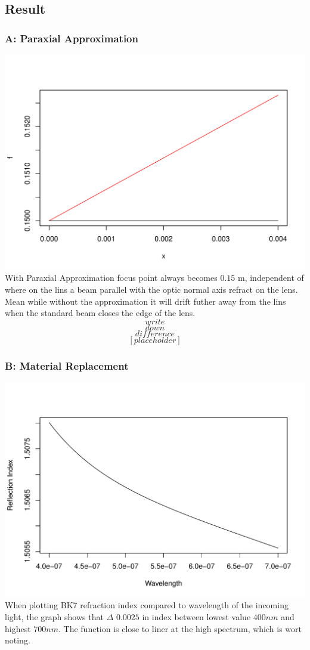 \documentclass[12pt]{article}
\begin{document}
\subsection{Result}

\subsubsection{A: Paraxial Approximation}
\includegraphics[scale=0.6]{para_approx.pdf}
With Paraxial Approximation focus point always becomes $0.15$ m, independent 
of where on the lins a beam parallel with the optic normal axis refract on the lens.
Mean while without the approximation it will drift futher away from the lins 
when the standard beam closes the edge of the lens.
$$write$$ $$down$$ $$difference$$ $$[placeholder]$$

\subsubsection{B: Material Replacement}
\includegraphics[scale=0.6]{BK7_index.pdf}
When plotting BK7 refraction index compared to wavelength of the incoming light,
the graph shows that $\Delta$ $0.0025$ in index between lowest value 
$400 nm$ and highest $700 nm$.
The function is close to liner at the high spectrum, which is wort noting.
\end{document}
